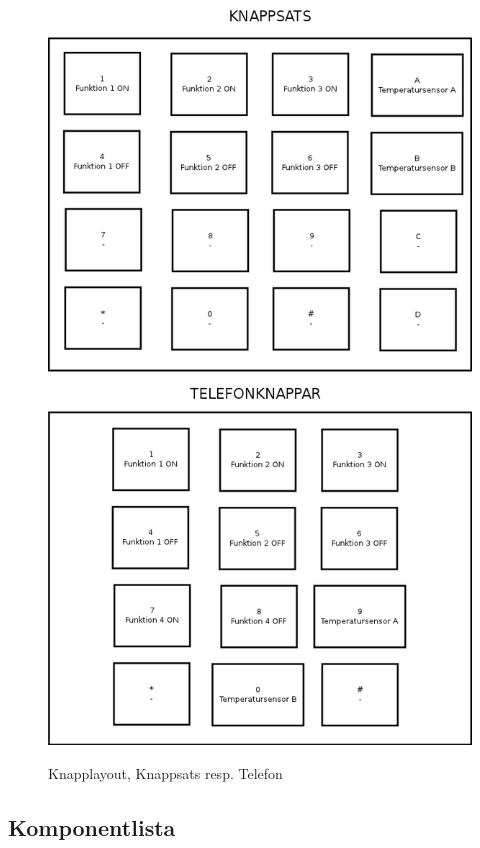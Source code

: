 \documentclass[a4paper,11pt]{article}
\begin{document}
		\begin{figure}[ht!]
		  \centering
		      \includegraphics[scale=0.48, angle=0]{UserInterface.png}
			\label{fig:UserInterface}
		  	\caption{Knapplayout, Knappsats resp. Telefon}
		\end{figure}

	\subsection{Komponentlista}
\end{document}
